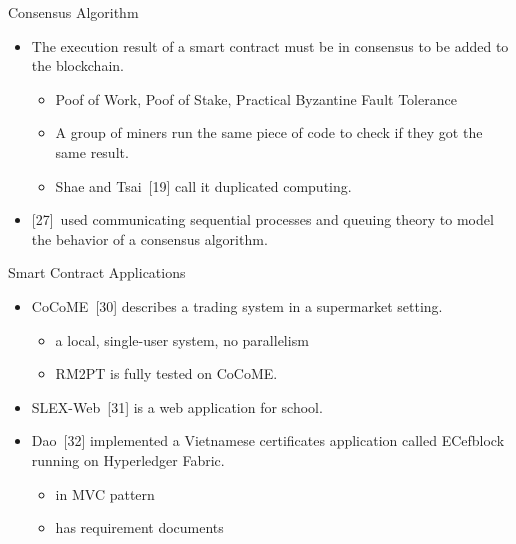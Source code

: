 \documentclass[xcolor=svgnames]{beamer}
\begin{document}
\begin{frame}[t]{Consensus Algorithm}
\begin{itemize}
\item The execution result of a smart contract must be in consensus to be added to the blockchain.


\begin{itemize}
\item<2-> Poof of Work, Poof of Stake, Practical Byzantine Fault Tolerance
\item<2-> A group of miners run the same piece of code to check if they got the same result.
\item<3-> Shae and Tsai~[19] call it duplicated computing.
\end{itemize}

\item<4-> {[27]}~used communicating sequential processes and queuing theory to model the behavior of a consensus algorithm.
\end{itemize}

\end{frame}

\begin{frame}{Smart Contract Applications}
\begin{itemize}
\item CoCoME~[30] describes a trading system in a supermarket setting.
	\begin{itemize}
	\item a local, single-user system, no parallelism
	\item RM2PT is fully tested on CoCoME.
	\end{itemize}

\item SLEX-Web~[31] is a web application for school.
\item Dao~[32] implemented a Vietnamese certificates application called ECefblock running on Hyperledger Fabric.
	\begin{itemize}
	\item in MVC pattern
	\item has requirement documents
	\end{itemize}
\end{itemize}
\end{frame}
\end{document}
